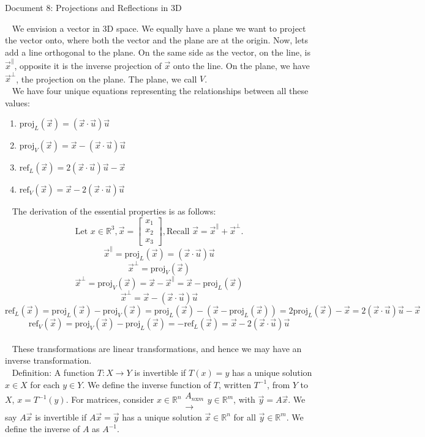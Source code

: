 \documentclass[11pt]{article}
\begin{document}
\begin{center}
Document 8: Projections and Reflections in 3D
\end{center}

\setlength{\leftskip}{0 in}
$\,\,\,$ We envision a vector in 3D space. We equally have a plane we want to project the vector onto, where both the vector and the plane are at the origin. Now, lets add a line orthogonal to the plane. On the same side as the vector, on the line, is $\vec{x}^\parallel$, opposite it is the inverse projection of $\vec{x}$ onto the line. On the plane, we have $\vec{x}^\perp$, the projection on the plane. The plane, we call $V$.\\

$\,\,\,$ We have four unique equations representing the relationships between all these values:
\begin{enumerate}
\item $\text{proj}_L(\vec{x})=(\vec{x}\cdot\vec{u})\vec{u}$
\item $\text{proj}_V(\vec{x})=\vec{x}-(\vec{x}\cdot\vec{u})\vec{u}$
\item $\text{ref}_L(\vec{x})=2(\vec{x}\cdot\vec{u})\vec{u}-\vec{x}$
\item $\text{ref}_V(\vec{x})=\vec{x}-2(\vec{x}\cdot\vec{u})\vec{u}$
\end{enumerate}

$\,\,\,$ The derivation of the essential properties is as follows:
$$\text{Let }x\in\mathbb{R}^3,\vec{x}=\begin{bmatrix}x_1\\x_2\\x_3\end{bmatrix},
\text{Recall }\vec{x}=\vec{x}^\parallel+\vec{x}^\perp.$$
$$\vec{x}^\parallel=\text{proj}_L(\vec{x})=(\vec{x}\cdot\vec{u})\vec{u}$$
$$\vec{x}^\perp=\text{proj}_V(\vec{x})$$
$$\vec{x}^\perp=\text{proj}_V(\vec{x})=\vec{x}-\vec{x}^\parallel=\vec{x}-\text{proj}_L(\vec{x})$$
$$\vec{x}^\perp=\vec{x}-(\vec{x}\cdot\vec{u})\vec{u}$$
$$\text{ref}_L(\vec{x})=\text{proj}_L(\vec{x})-\text{proj}_V(\vec{x})=\text{proj}_L(\vec{x})-(\vec{x}-\text{proj}_L(\vec{x}))=2\text{proj}_L(\vec{x})-\vec{x}=2(\vec{x}\cdot\vec{u})\vec{u}-\vec{x}$$
$$\text{ref}_V(\vec{x})=\text{proj}_V(\vec{x})-\text{proj}_L(\vec{x})=-\text{ref}_L(\vec{x})=\vec{x}-2(\vec{x}\cdot\vec{u})\vec{u}$$\\

$\,\,\,$ These transformations are linear transformations, and hence we may have an inverse transformation.\\
\newpage
$\,\,\,$ Definition: A function $T:X\rightarrow Y$ is invertible if $T(x)=y$ has a unique solution $x\in X$ for each $y\in Y$. We define the inverse function of $T$, written $T^{-1}$, from $Y$ to $X$, $x=T^{-1}(y)$. For matrices, consider $x\in\mathbb{R}^n\begin{matrix}A_{n\text{x}m}\\ \rightarrow \end{matrix}y\in\mathbb{R}^m$, with $\vec{y}=A\vec{x}$.
We say $A\vec{x}$ is invertible if $A\vec{x}=\vec{y}$ has a unique solution $\vec{x}\in\mathbb{R}^n$ for all $\vec{y}\in\mathbb{R}^m$. We define the inverse of $A$ as $A^{-1}$.\\
\end{document}

